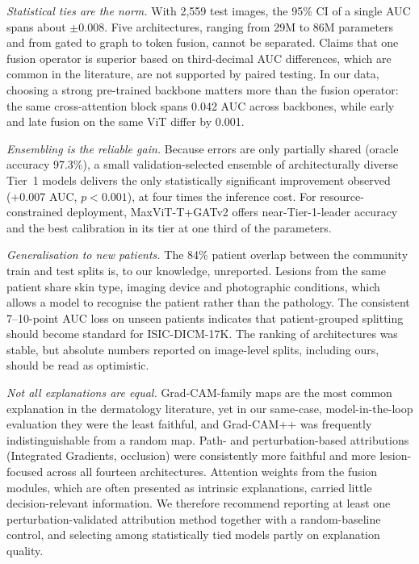 \documentclass[journal]{IEEEtran}
\begin{document}
\textit{Statistical ties are the norm.} With 2,559 test images, the 95\% CI of a single AUC spans about $\pm0.008$. Five architectures, ranging from 29M to 86M parameters and from gated to graph to token fusion, cannot be separated. Claims that one fusion operator is superior based on third-decimal AUC differences, which are common in the literature, are not supported by paired testing. In our data, choosing a strong pre-trained backbone matters more than the fusion operator: the same cross-attention block spans 0.042 AUC across backbones, while early and late fusion on the same ViT differ by 0.001.

\textit{Ensembling is the reliable gain.} Because errors are only partially shared (oracle accuracy 97.3\%), a small validation-selected ensemble of architecturally diverse Tier~1 models delivers the only statistically significant improvement observed (+0.007 AUC, $p<0.001$), at four times the inference cost. For resource-constrained deployment, MaxViT-T+GATv2 offers near-Tier-1-leader accuracy and the best calibration in its tier at one third of the parameters.

\textit{Generalisation to new patients.} The 84\% patient overlap between the community train and test splits is, to our knowledge, unreported. Lesions from the same patient share skin type, imaging device and photographic conditions, which allows a model to recognise the patient rather than the pathology. The consistent 7--10-point AUC loss on unseen patients indicates that patient-grouped splitting should become standard for ISIC-DICM-17K. The ranking of architectures was stable, but absolute numbers reported on image-level splits, including ours, should be read as optimistic.

\textit{Not all explanations are equal.} Grad-CAM-family maps are the most common explanation in the dermatology literature, yet in our same-case, model-in-the-loop evaluation they were the least faithful, and Grad-CAM++ was frequently indistinguishable from a random map. Path- and perturbation-based attributions (Integrated Gradients, occlusion) were consistently more faithful and more lesion-focused across all fourteen architectures. Attention weights from the fusion modules, which are often presented as intrinsic explanations, carried little decision-relevant information. We therefore recommend reporting at least one perturbation-validated attribution method together with a random-baseline control, and selecting among statistically tied models partly on explanation quality.
\end{document}
